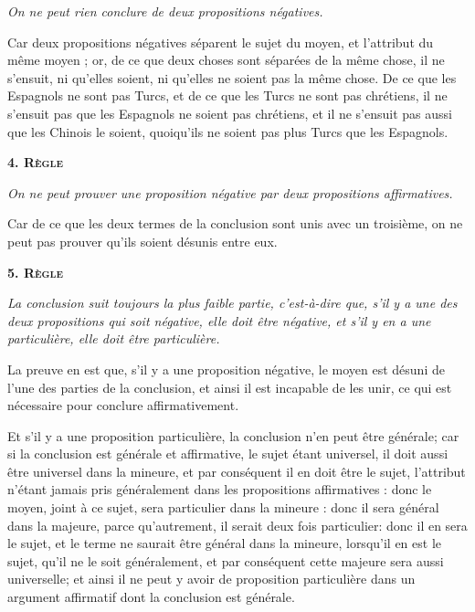 	\emph{On ne peut rien conclure de deux propositions négatives.}

Car deux propositions négatives séparent le sujet du moyen, et l'attribut du même moyen ; or, de ce que deux choses sont séparées de la même chose, il ne s'ensuit, ni qu'elles soient, ni qu'elles ne soient pas la même chose. De ce que les Espagnols ne sont pas Turcs, et de ce que les Turcs ne sont pas chrétiens, il ne s'ensuit pas que les Espagnols ne soient pas chrétiens, et il ne s'ensuit pas aussi que les Chinois le soient, quoiqu'ils ne soient pas plus Turcs que les Espagnols.

\begin{center}{\bfseries\scshape\large 4. Règle}\end{center}

	\emph{On ne peut prouver une proposition négative par deux propositions affirmatives.}

Car de ce que les deux termes de la conclusion sont unis avec un troisième, on ne peut pas prouver qu'ils soient désunis entre eux.

\begin{center}{\bfseries\scshape\large 5. Règle}\end{center}

	\emph{La conclusion suit toujours la plus faible partie, c'est-à-dire que, s'il y a une des deux propositions qui soit négative, elle doit être négative, et s'il y en a une particulière, elle doit être particulière.}

La preuve en est que, s'il y a une proposition négative, le moyen est désuni de l'une des parties de la conclusion, et ainsi il est incapable de les unir, ce qui est nécessaire pour conclure affirmativement.

Et s'il y a une proposition particulière, la conclusion n'en peut être générale; car si la conclusion est générale et affirmative, le sujet étant universel, il doit aussi être universel dans la mineure, et par conséquent il en doit être le sujet, l'attribut n'étant jamais pris généralement dans les propositions affirmatives : donc le moyen, joint à ce sujet, sera particulier dans la mineure : donc il sera général dans la majeure, parce qu'autrement, il serait deux fois particulier: donc il en sera le sujet, et le terme ne saurait être général dans la mineure, lorsqu'il en est le sujet, qu'il ne le soit généralement, et par conséquent cette majeure sera aussi universelle; et ainsi il ne peut y avoir de proposition particulière dans un argument affirmatif dont la conclusion est générale.

